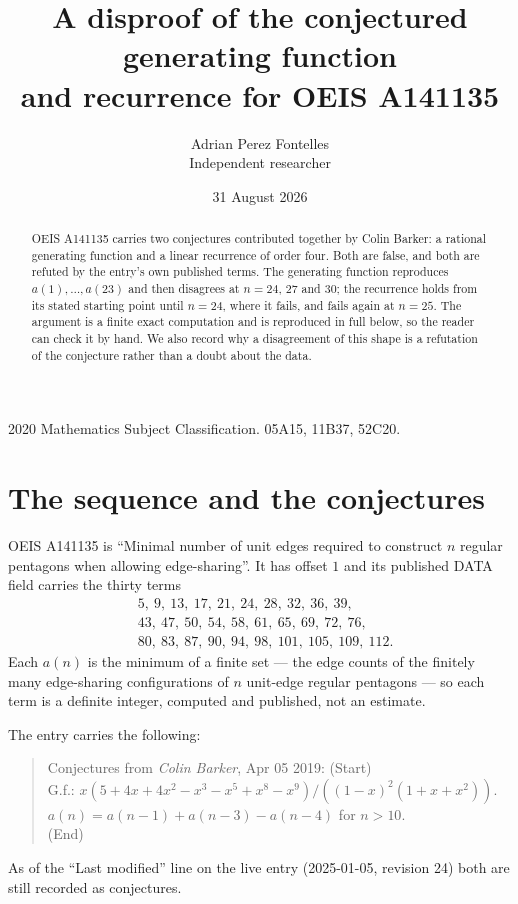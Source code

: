 \documentclass[11pt,a4paper]{article}
\title{A disproof of the conjectured generating function\\ and recurrence for OEIS A141135}
\author{Adrian Perez Fontelles\\ \small Independent researcher}
\date{31 August 2026}
\theoremstyle{plain}
\theoremstyle{definition}
\begin{document}
\maketitle

\begin{abstract}
OEIS A141135 carries two conjectures contributed together by Colin Barker: a rational
generating function and a linear recurrence of order four. Both are false, and both are
refuted by the entry's own published terms. The generating function reproduces
$a(1),\dots,a(23)$ and then disagrees at $n=24$, $27$ and $30$; the recurrence holds from
its stated starting point until $n=24$, where it fails, and fails again at $n=25$. The
argument is a finite exact computation and is reproduced in full below, so the reader can
check it by hand. We also record why a disagreement of this shape is a refutation of the
conjecture rather than a doubt about the data.
\end{abstract}

\noindent\small 2020 Mathematics Subject Classification. 05A15, 11B37, 52C20.\normalsize

\section{The sequence and the conjectures}

OEIS A141135 is ``Minimal number of unit edges required to construct $n$ regular pentagons
when allowing edge-sharing''. It has offset $1$ and its published DATA field carries the
thirty terms
\[
\begin{aligned}
&5,\ 9,\ 13,\ 17,\ 21,\ 24,\ 28,\ 32,\ 36,\ 39,\\
&43,\ 47,\ 50,\ 54,\ 58,\ 61,\ 65,\ 69,\ 72,\ 76,\\
&80,\ 83,\ 87,\ 90,\ 94,\ 98,\ 101,\ 105,\ 109,\ 112 .
\end{aligned}
\]
Each $a(n)$ is the minimum of a finite set --- the edge counts of the finitely many
edge-sharing configurations of $n$ unit-edge regular pentagons --- so each term is a
definite integer, computed and published, not an estimate.

The entry carries the following:
\begin{quote}\small
Conjectures from \emph{Colin Barker}, Apr 05 2019: (Start)\\
G.f.: $x(5 + 4x + 4x^{2} - x^{3} - x^{5} + x^{8} - x^{9}) / ((1 - x)^{2}(1 + x + x^{2}))$.\\
$a(n) = a(n-1) + a(n-3) - a(n-4)$ for $n>10$.\\
(End)
\end{quote}
As of the ``Last modified'' line on the live entry (2025-01-05, revision 24) both are still
recorded as conjectures.
\end{document}
